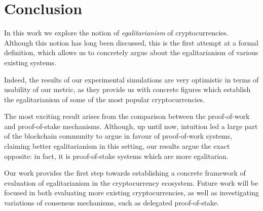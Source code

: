 \section{Conclusion}\label{sec:conclusion}

In this work we explore the notion of \emph{egalitarianism} of
cryptocurrencies. Although this notion has long been discussed, this is the
first attempt at a formal definition, which allows us to concretely argue about
the egalitarianism of various existing systems.

Indeed, the results of our experimental simulations are very optimistic in
terms of usability of our metric, as they provide us with concrete figures
which establish the egalitarianism of some of the most popular
cryptocurrencies.

The most exciting result arises from the comparison between the proof-of-work
and proof-of-stake mechanisms. Although, up until now, intuition led a large
part of the blockchain community to argue in favour of proof-of-work systems,
claiming better egalitarianism in this setting, our results argue the exact
opposite: in fact, it is proof-of-stake systems which are more egalitarian.

Our work provides the first step towards establishing a concrete framework of
evaluation of egalitarianism in the cryptocurrency ecosystem. Future work will
be focused in both evaluating more existing cryptocurrencies, as well as
investigating variations of consensus mechanisms, such as delegated
proof-of-stake.
